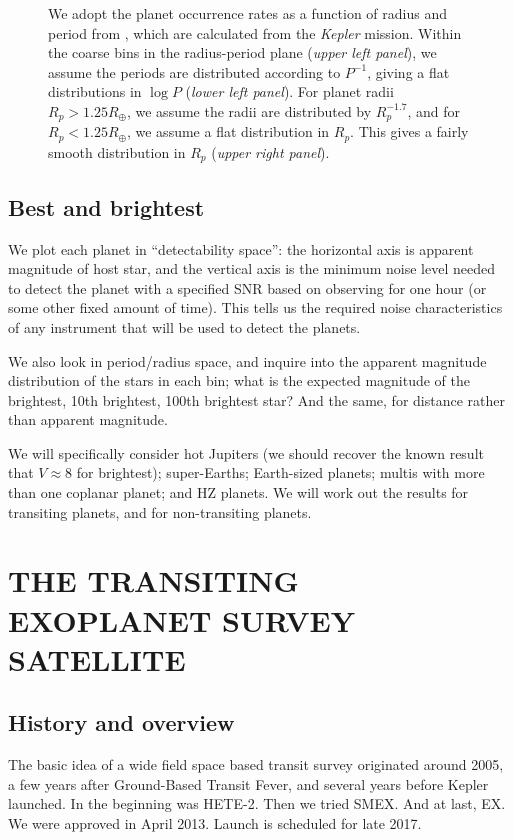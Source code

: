 \documentclass{emulateapj}
\begin{document}
\begin{figure}[htbp]
\caption{We adopt the planet occurrence rates as a function of radius and period from \citet{fressin2013}, which are calculated from the \textit{Kepler} mission. Within the coarse bins in the radius-period plane (\textit{upper left panel}), we assume the periods are distributed according to $P^{-1}$, giving a flat distributions in $\log{P}$ (\textit{lower left panel}). For planet radii $R_p>1.25R_{\oplus}$, we assume the radii are distributed by $R_p^{-1.7}$, and for $R_p<1.25R_{\oplus}$, we assume a flat distribution in $R_p$. This gives a fairly smooth distribution in $R_p$ (\textit{upper right panel}).}
\end{figure}

\subsection{Best and brightest}
 
We plot each planet in ``detectability space'': the horizontal axis is
apparent magnitude of host star, and the vertical axis is the minimum
noise level needed to detect the planet with a specified SNR based on
observing for one hour (or some other fixed amount of time).  This
tells us the required noise characteristics of any instrument that
will be used to detect the planets.

We also look in period/radius space, and inquire into the apparent
magnitude distribution of the stars in each bin; what is the expected
magnitude of the brightest, 10th brightest, 100th brightest star?  And
the same, for distance rather than apparent magnitude.

We will specifically consider hot Jupiters (we should recover the
known result that $V\approx 8$ for brightest); super-Earths;
Earth-sized planets; multis with more than one coplanar planet; and HZ
planets.  We will work out the results for transiting planets, and for
non-transiting planets.

\section{THE TRANSITING EXOPLANET SURVEY SATELLITE}
\label{sec:tess}
\subsection{History and overview}

The basic idea of a wide field space based transit survey originated
around 2005, a few years after Ground-Based Transit Fever, and several
years before Kepler launched. In the beginning was HETE-2. Then we
tried SMEX. And at last, EX.  We were approved in April 2013. Launch
is scheduled for late 2017.
\end{document}
